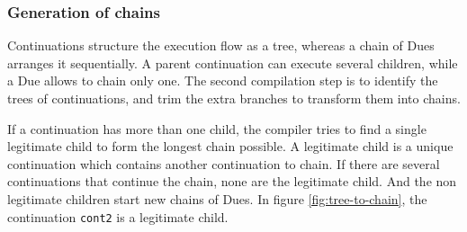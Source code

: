 


\subsubsection{Generation of chains}

Continuations structure the execution flow as a tree, whereas a chain of Dues arranges it sequentially.
A parent continuation can execute several children, while a Due allows to chain only one.
The second compilation step is to identify the trees of continuations, and trim the extra branches to transform them into chains.

If a continuation has more than one child, the compiler tries to find a single legitimate child to form the longest chain possible.
A legitimate child is a unique continuation which contains another continuation to chain.
If there are several continuations that continue the chain, none are the legitimate child.
And the non legitimate children start new chains of Dues.
In figure \ref{fig:tree-to-chain}, the continuation \texttt{cont2} is a legitimate child.


